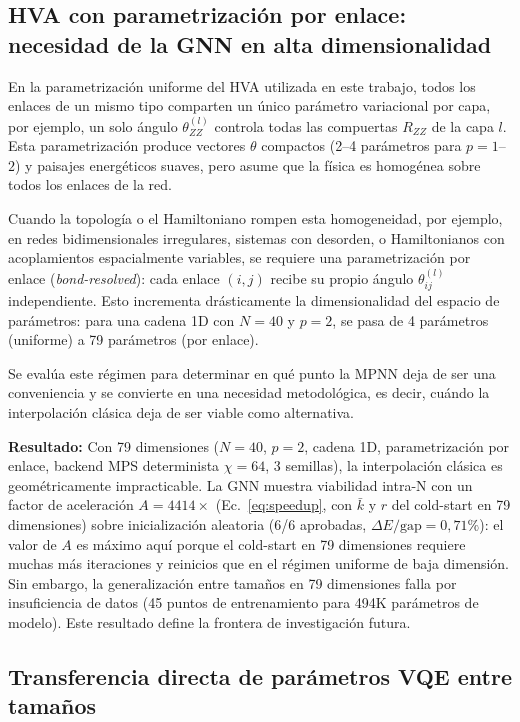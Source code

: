 \documentclass[11pt,a4paper,spanish]{book}
\begin{document}


\subsection{HVA con parametrización por enlace: necesidad de la GNN en alta dimensionalidad}
\label{subsec:bond_resolved}

En la parametrización uniforme del HVA utilizada en este trabajo, todos los enlaces de un mismo tipo comparten un único parámetro variacional por capa, por ejemplo, un solo ángulo $\theta_{ZZ}^{(l)}$ controla todas las compuertas $R_{ZZ}$ de la capa $l$. Esta parametrización produce vectores $\theta$ compactos (2--4 parámetros para $p = 1$--$2$) y paisajes energéticos suaves, pero asume que la física es homogénea sobre todos los enlaces de la red.

Cuando la topología o el Hamiltoniano rompen esta homogeneidad, por ejemplo, en redes bidimensionales irregulares, sistemas con desorden, o Hamiltonianos con acoplamientos espacialmente variables, se requiere una parametrización por enlace (\emph{bond-resolved}): cada enlace $(i,j)$ recibe su propio ángulo $\theta_{ij}^{(l)}$ independiente. Esto incrementa drásticamente la dimensionalidad del espacio de parámetros: para una cadena 1D con $N = 40$ y $p = 2$, se pasa de 4 parámetros (uniforme) a 79 parámetros (por enlace).

Se evalúa este régimen para determinar en qué punto la MPNN deja de ser una conveniencia y se convierte en una necesidad metodológica, es decir, cuándo la interpolación clásica deja de ser viable como alternativa.

\textbf{Resultado:} Con 79 dimensiones ($N = 40$, $p = 2$, cadena 1D, parametrización por enlace, backend MPS determinista $\chi = 64$, 3 semillas), la interpolación clásica es geométricamente impracticable. La GNN muestra viabilidad intra-N con un factor de aceleración $A = 4414\times$ (Ec.~\ref{eq:speedup}, con $\bar{k}$ y $r$ del cold-start en 79 dimensiones) sobre inicialización aleatoria (6/6 aprobadas, $\Delta E/\text{gap} = 0,71\%$): el valor de $A$ es máximo aquí porque el cold-start en 79 dimensiones requiere muchas más iteraciones y reinicios que en el régimen uniforme de baja dimensión. Sin embargo, la generalización entre tamaños en 79 dimensiones falla por insuficiencia de datos (45 puntos de entrenamiento para 494K parámetros de modelo). Este resultado define la frontera de investigación futura.

\subsection{Transferencia directa de parámetros VQE entre tamaños}
\end{document}
